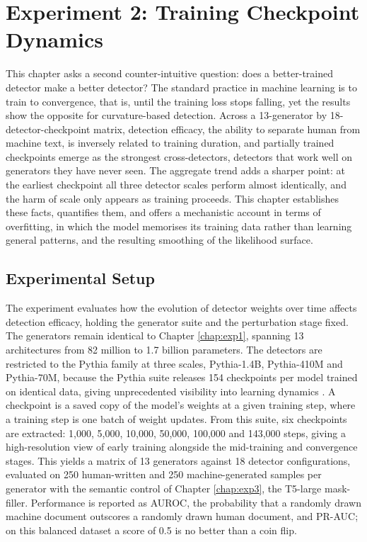 \documentclass[logo,msc,cs]{infthesis}      %
\begin{document}
\chapter{Experiment 2: Training Checkpoint Dynamics}
\label{chap:exp2}
This chapter asks a second counter-intuitive question: does a better-trained detector make a better detector? The standard practice in machine learning is to train to convergence, that is, until the training loss stops falling, yet the results show the opposite for curvature-based detection. Across a 13-generator by 18-detector-checkpoint matrix, detection efficacy, the ability to separate human from machine text, is inversely related to training duration, and partially trained checkpoints emerge as the strongest cross-detectors, detectors that work well on generators they have never seen. The aggregate trend adds a sharper point: at the earliest checkpoint all three detector scales perform almost identically, and the harm of scale only appears as training proceeds. This chapter establishes these facts, quantifies them, and offers a mechanistic account in terms of overfitting, in which the model memorises its training data rather than learning general patterns, and the resulting smoothing of the likelihood surface.

\section{Experimental Setup}
\label{sec:exp2_setup}
The experiment evaluates how the evolution of detector weights over time affects detection efficacy, holding the generator suite and the perturbation stage fixed. The generators remain identical to Chapter \ref{chap:exp1}, spanning 13 architectures from 82 million to 1.7 billion parameters.
The detectors are restricted to the Pythia family at three scales, Pythia-1.4B, Pythia-410M and Pythia-70M, because the Pythia suite releases 154 checkpoints per model trained on identical data, giving unprecedented visibility into learning dynamics \citep{biderman2023pythia}. A checkpoint is a saved copy of the model's weights at a given training step, where a training step is one batch of weight updates. From this suite, six checkpoints are extracted: 1,000, 5,000, 10,000, 50,000, 100,000 and 143,000 steps, giving a high-resolution view of early training alongside the mid-training and convergence stages. This yields a matrix of 13 generators against 18 detector configurations, evaluated on 250 human-written and 250 machine-generated samples per generator with the semantic control of Chapter \ref{chap:exp3}, the T5-large mask-filler. Performance is reported as AUROC, the probability that a randomly drawn machine document outscores a randomly drawn human document, and PR-AUC; on this balanced dataset a score of 0.5 is no better than a coin flip.
\end{document}
